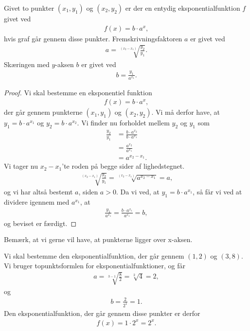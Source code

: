 \begin{setn}
Givet to punkter $(x_1,y_1)$ og $(x_2,y_2)$ er der en entydig eksponentialfunktion $f$ givet ved
\begin{align*}
f(x) = b\cdot a^x,
\end{align*}
hvis graf går gennem disse punkter. Fremskrivningsfaktoren $a$ er givet ved
\begin{align*}
a=\sqrt[(x_2-x_1)]{\frac{y_2}{y_1}}.
\end{align*}
Skæringen med $y$-aksen $b$ er givet ved
\begin{align*}
b = \frac{y_1}{a^{x_1}}.
\end{align*}
\end{setn}
\begin{proof}
Vi skal bestemme en eksponentiel funktion
\begin{align*}
f(x) = b\cdot a^x, 
\end{align*}
der går gennem punkterne $(x_1,y_1)$ og $(x_2,y_2)$. Vi må derfor have, at $y_1 = b\cdot a^{x_1}$ og $y_2 = b\cdot a^{x_2}$. Vi finder nu forholdet mellem $y_2$ og $y_1$ som
\begin{align*}
\frac{y_2}{y_1} &= \frac{b\cdot a^{x_2}}{b\cdot a^{x_1}}\\
				&= \frac{a^{x_2}}{a^{x_1}}\\
				&=a^{x_2-x_1}.
\end{align*}
Vi tager nu $x_2-x_1$'te roden på begge sider af lighedstegnet.
\begin{align*}
\sqrt[(x_2-x_1)]{\frac{y_2}{y_1}} = \sqrt[(x_2-x_1)]{a^{x_2-x_1}} = a,
\end{align*}
og vi har altså bestemt $a$, siden $a>0$. Da vi ved, at $y_1 = b\cdot a^{x_1}$, så får vi ved at dividere igennem med $a^{x_1}$, at 
\begin{align*}
\frac{y_1}{a^{x_1}} = \frac{b\cdot a^{x_1}}{a^{x_1}} = b, 
\end{align*}
og beviset er færdigt. 
\end{proof}
Bemærk, at vi gerne vil have, at punkterne ligger over x-aksen.
\begin{exa}
Vi skal bestemme den eksponentialfunktion, der går gennem $(1,2)$ og $(3,8)$. Vi bruger topunktsformlen for eksponentialfunktioner, og får
\begin{align*}
a = \sqrt[3-1]{\frac{8}{2}} = \sqrt[2]{4} = 2, 
\end{align*}
og 
\begin{align*}
b = \frac{2}{2^{1}} = 1.
\end{align*}
Den eksponentialfunktion, der går gennem disse punkter er derfor 
\begin{align*}
f(x) = 1\cdot 2^x = 2^x.
\end{align*}
\end{exa}

